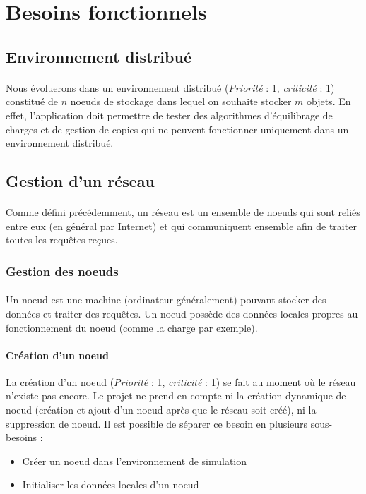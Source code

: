 \documentclass[12pt]{article}
\newcommand{\besoin}[2] {
  (\textit{Priorité} : #1, \textit{criticité} : #2)
}
\begin{document}
\newpage

\section{Besoins fonctionnels}


\subsection{Environnement distribué}

\paragraph{} Nous évoluerons dans un environnement distribué \besoin{1}{1} constitué de $n$ noeuds de stockage dans lequel on souhaite stocker $m$ objets.
En effet, l'application doit permettre de tester des algorithmes d'équilibrage de charges et de gestion de copies qui ne peuvent fonctionner uniquement dans un environnement distribué.


\subsection{Gestion d'un réseau}

\paragraph{} Comme défini précédemment, un réseau est un ensemble de noeuds qui sont reliés entre eux (en général par Internet) et qui communiquent ensemble afin de traiter toutes les requêtes reçues.


\subsubsection{Gestion des noeuds}

\paragraph{} Un noeud est une machine (ordinateur généralement) pouvant stocker des données et traiter des requêtes. Un noeud possède des données locales propres au fonctionnement du noeud (comme la charge par exemple).

\paragraph{Création d'un noeud} La création d'un noeud \besoin{1}{1} se fait au moment où le réseau n'existe pas encore. 
Le projet ne prend en compte ni la création dynamique de noeud (création et ajout d'un noeud après que le réseau soit créé), ni la suppression de noeud. 
Il est possible de séparer ce besoin en plusieurs sous-besoins :
 \begin{itemize}
 	\item Créer un noeud dans l'environnement de simulation
 	\item Initialiser les données locales d'un noeud
 \end{itemize}
 
\end{document}
